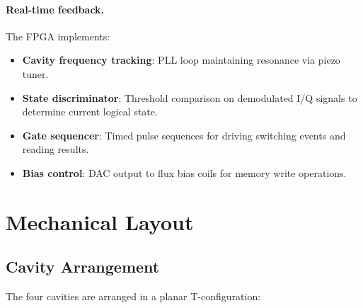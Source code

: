 \documentclass[12pt,a4paper]{article}
\begin{document}
\paragraph{Real-time feedback.} The FPGA implements:
\begin{itemize}
\item \textbf{Cavity frequency tracking}: PLL loop maintaining resonance via piezo tuner.
\item \textbf{State discriminator}: Threshold comparison on demodulated I/Q signals to determine current logical state.
\item \textbf{Gate sequencer}: Timed pulse sequences for driving switching events and reading results.
\item \textbf{Bias control}: DAC output to flux bias coils for memory write operations.
\end{itemize}

\section{Mechanical Layout}

\subsection{Cavity Arrangement}

The four cavities are arranged in a planar T-configuration:
\end{document}
